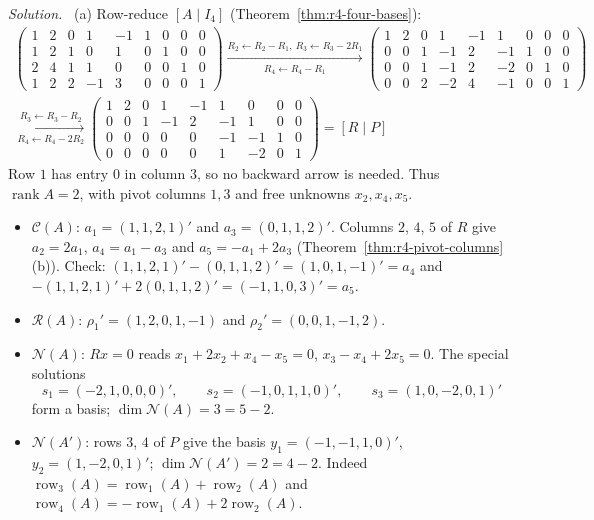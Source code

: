 \documentclass[12pt]{article}
\DeclareMathOperator{\row}{row}
\DeclareMathOperator{\rank}{rank}
\theoremstyle{definition}
\newenvironment{solution}{\par\noindent\textit{Solution.}\ }{\par\smallskip}
\begin{document}
\begin{solution}
(a) Row-reduce \([A\mid I_4]\) (Theorem~\ref{thm:r4-four-bases}):
\[
\begin{gathered}
\left(\begin{array}{ccccc|cccc}1&2&0&1&-1&1&0&0&0\\1&2&1&0&1&0&1&0&0\\2&4&1&1&0&0&0&1&0\\1&2&2&-1&3&0&0&0&1\end{array}\right)
\xrightarrow[R_4\leftarrow R_4-R_1]{R_2\leftarrow R_2-R_1,\ R_3\leftarrow R_3-2R_1}
\left(\begin{array}{ccccc|cccc}1&2&0&1&-1&1&0&0&0\\0&0&1&-1&2&-1&1&0&0\\0&0&1&-1&2&-2&0&1&0\\0&0&2&-2&4&-1&0&0&1\end{array}\right)
\\
\xrightarrow[R_4\leftarrow R_4-2R_2]{R_3\leftarrow R_3-R_2}
\left(\begin{array}{ccccc|cccc}1&2&0&1&-1&1&0&0&0\\0&0&1&-1&2&-1&1&0&0\\0&0&0&0&0&-1&-1&1&0\\0&0&0&0&0&1&-2&0&1\end{array}\right)
=[R\mid P]
\end{gathered}
\]
Row \(1\) has entry \(0\) in column \(3\), so no backward arrow is needed. Thus \(\rank A=2\), with
pivot columns \(1,3\) and free unknowns \(x_2,x_4,x_5\).
\begin{itemize}
\item \(\mathcal C(A)\): \(a_1=(1,1,2,1)'\) and \(a_3=(0,1,1,2)'\). Columns \(2\), \(4\), \(5\) of \(R\)
give \(a_2=2a_1\), \(a_4=a_1-a_3\) and \(a_5=-a_1+2a_3\) (Theorem~\ref{thm:r4-pivot-columns}(b)).
Check: \((1,1,2,1)'-(0,1,1,2)'=(1,0,1,-1)'=a_4\) and
\(-(1,1,2,1)'+2(0,1,1,2)'=(-1,1,0,3)'=a_5\).
\item \(\mathcal R(A)\): \(\rho_1'=(1,2,0,1,-1)\) and \(\rho_2'=(0,0,1,-1,2)\).
\item \(\mathcal N(A)\): \(Rx=0\) reads \(x_1+2x_2+x_4-x_5=0\), \(x_3-x_4+2x_5=0\). The special
solutions
\[
s_1=(-2,1,0,0,0)',\qquad s_2=(-1,0,1,1,0)',\qquad s_3=(1,0,-2,0,1)'
\]
form a basis; \(\dim\mathcal N(A)=3=5-2\).
\item \(\mathcal N(A')\): rows \(3\), \(4\) of \(P\) give the basis \(y_1=(-1,-1,1,0)'\),
\(y_2=(1,-2,0,1)'\); \(\dim\mathcal N(A')=2=4-2\). Indeed \(\row_3(A)=\row_1(A)+\row_2(A)\) and
\(\row_4(A)=-\row_1(A)+2\row_2(A)\).

\end{itemize}
\end{solution}
\end{document}
